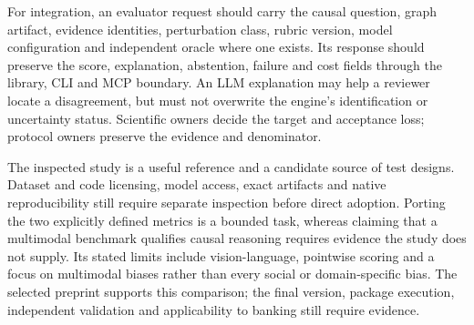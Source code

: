 For integration, an evaluator request should carry the causal question,
graph artifact, evidence identities, perturbation class, rubric version,
model configuration and independent oracle where one exists. Its response
should preserve the score, explanation, abstention, failure and cost fields
through the library, CLI and MCP boundary. An LLM explanation may help a
reviewer locate a disagreement, but must not overwrite the engine's
identification or uncertainty status. Scientific owners decide the target
and acceptance loss; protocol owners preserve the evidence and denominator.
\citep{exec24_judgebias_reference}

The inspected study is a useful reference and a candidate source of test
designs. Dataset and code licensing, model access, exact artifacts and
native reproducibility still require separate inspection before direct
adoption. Porting the two explicitly defined metrics is a bounded task,
whereas claiming that a multimodal benchmark qualifies causal reasoning
requires evidence the study does not supply. Its stated limits include
vision-language, pointwise scoring and a focus on multimodal biases rather
than every social or domain-specific bias. The selected preprint supports this comparison; the final version, package execution, independent validation and applicability to banking still require evidence.
\citep{exec24_judgebias_original,exec24_judgebias_reference}

